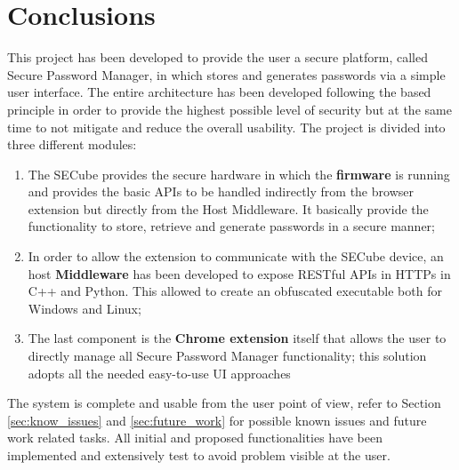 \chapter{Conclusions}
\label{sec:conclusions}

This project has been developed to provide the user a secure platform, called Secure Password Manager, in which stores and generates passwords via a simple user interface. The entire architecture has been developed following the based principle in order to provide the highest possible level of security but at the same time to not mitigate and reduce the overall usability.\newline\newline
The project is divided into three different modules:
\begin{enumerate}
	\item The SECube provides the secure hardware in which the \textbf{firmware} is running and provides the basic APIs to be handled indirectly from the browser extension but directly from the Host Middleware. It basically provide the functionality to store, retrieve and generate passwords in a secure manner;
	\item In order to allow the extension to communicate with the SECube device, an host \textbf{Middleware} has been developed to expose RESTful APIs in HTTPs in C++ and Python. This allowed to create an obfuscated executable both for Windows and Linux;
	\item The last component is the \textbf{Chrome extension} itself that allows the user to directly manage all Secure Password Manager functionality; this solution adopts all the needed easy-to-use UI approaches
\end{enumerate}
The system is complete and usable from the user point of view, refer to Section \ref{sec:know_issues} and \ref{sec:future_work} for possible known issues and future work related tasks. All initial and proposed functionalities have been implemented and extensively test to avoid problem visible at the user. 

